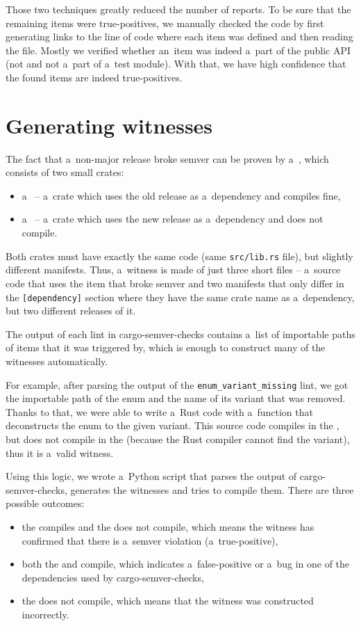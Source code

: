 \documentclass[licencjacka,en]{pracamgr}
\begin{document}
Those two techniques greatly reduced the number of reports.
To be sure that the remaining items were true-positives,
we manually checked the code by first generating links to the line of code where each item
was defined and then reading the file.
Mostly we verified whether an~item was indeed a~part of the public API
(not  and not a~part of a~test module).
With that, we have high confidence that the found items are indeed true-positives.

\section{Generating witnesses}\label{r:section_generating_witnesses}

The fact that a~non-major release broke semver can be proven by a~,
which consists of two small crates:
\begin{itemize}
	\item a~ -- a~crate which uses the old release as a~dependency
		and compiles fine,
	\item a~ -- a~crate which uses the new release as a~dependency
		and does not compile.
\end{itemize}
Both crates must have exactly the same code (same \texttt{src/lib.rs} file),
but slightly different manifests.
Thus, a~witness is made of just three short files -- a~source code that uses the item that
broke semver and two manifests that only differ in the \texttt{[dependency]} section
where they have the same crate name as a~dependency, but two different releases of it.

The output of each lint in cargo-semver-checks contains a~list of importable paths
of items that it was triggered by, which is enough to construct many of
the witnesses automatically.

For example, after parsing the output of the \texttt{enum\_variant\_missing} lint,
we got the importable path of the enum and the name of its variant that was removed.
Thanks to that, we were able to write a~Rust code with a~function that deconstructs the enum
to the given variant. This source code compiles in the , but does not compile
in the  (because the Rust compiler cannot find the variant), thus it is
a~valid witness.

Using this logic, we wrote a~Python script that parses the output of cargo-semver-checks,
generates the witnesses and tries to compile them.
There are three possible outcomes:
\begin{itemize}
	\item the  compiles and the  does not compile, which means
		the witness has confirmed that there is a~semver violation (a~true-positive),
	\item both the  and  compile, which indicates a~false-positive
		or a~bug in one of the dependencies used by cargo-semver-checks,
	\item the  does not compile, which means that the witness
		was constructed incorrectly.
\end{itemize}
\end{document}
